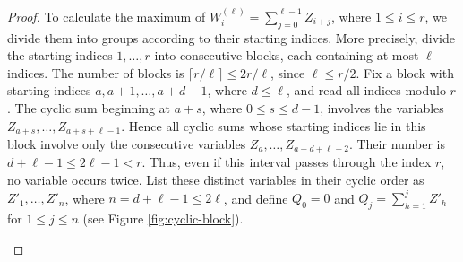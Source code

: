 \documentclass[10pt,a4paper]{amsart}
\numberwithin{equation}{section}
\begin{document}
\begin{proof}
To calculate the maximum of
$W_i^{(\ell)}=\sum_{j=0}^{\ell-1}Z_{i+j}$, where $1\le i\le r$, we divide them into groups according to their starting indices.  More precisely, divide the starting indices $1,\ldots,r$ into consecutive blocks, each containing at most $\ell$ indices.  The number of blocks is
$\lceil r/\ell\rceil\le2r/\ell$, since $\ell\le r/2$.  Fix a block with starting indices
$a,a+1,\ldots,a+d-1$, where $d\le\ell$, and read all indices modulo $r$.  The cyclic sum beginning at $a+s$, where $0\le s\le d-1$, involves the variables
$Z_{a+s},\ldots,Z_{a+s+\ell-1}$.  Hence all cyclic sums whose starting indices lie in this block involve only the consecutive variables
$Z_a,\ldots,Z_{a+d+\ell-2}$.
Their number is $d+\ell-1\le2\ell-1<r$.  Thus, even if this interval passes through the index $r$, no variable occurs twice.  List these distinct variables in their cyclic order as $Z'_1,\ldots,Z'_n$, where
$n=d+\ell-1\le2\ell$, and define
$Q_0=0$ and $Q_j=\sum_{h=1}^jZ'_h$ for $1\le j\le n$ (see Figure \ref{fig:cyclic-block}).



\begin{figure}[htbp]
\centering
{}
\end{figure}
\end{proof}
\end{document}
